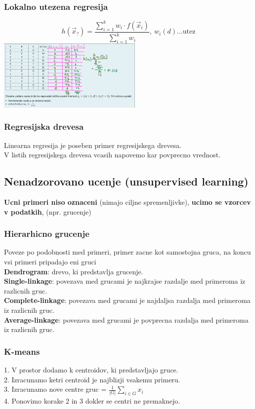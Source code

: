 \subsubsection{Lokalno utezena regresija}
$$h(\vec{x}_?) = \frac{\sum\limits_{i=1}^k w_i\cdot f(\vec{x}_i)}{\sum\limits_{i=1}^k w_i}, \: w_i(d) ... \text{utez}$$
\includegraphics[width=7cm]{./images/lokalno-utezena-regresija.png}\\



\subsubsection{Regresijska drevesa}
Linearna regresija je poseben primer regresijskega drevesa.\\
V listih regresijskega drevesa vcasih napovemo kar povprecno vrednost.

\subsection{Nenadzorovano ucenje (unsupervised learning)}
\textbf{Ucni primeri niso oznaceni} (nimajo ciljne spremenljivke),
\textbf{ucimo se vzorcev v podatkih}, (npr. grucenje)

\subsubsection{Hierarhicno grucenje}
Poveze po podobnosti med primeri, primer zacne kot samostojna gruca, na koncu vsi primeri pripadajo eni gruci\\
\textbf{Dendrogram}: drevo, ki predstavlja grucenje.\\
\textbf{Single-linkage}: povezava med grucami je najkrajse razdalje med primeroma iz razlicnih gruc.\\
\textbf{Complete-linkage}: povezava med grucami je najdaljsa razdalja med primeroma iz razlicnih gruc.\\
\textbf{Average-linkage}: povezava med grucami je povprecna razdalja med primeroma iz razlicnih gruc.\\


\subsubsection{K-means}
1. V prostor dodamo k centroidov, ki predstavljajo gruce.\\
2. Izracunamo ketri centroid je najblizji vsakemu primeru.\\
3. Izracunamo nove centre gruc = $\frac{1}{|G|}\sum\limits_{i\in G} x_i$\\
4. Ponovimo korake 2 in 3 dokler se centri ne premaknejo.\\

